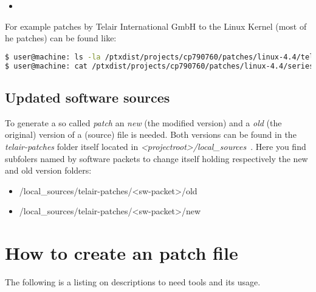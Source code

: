 \begin{itemize}
    \item
\end{itemize}

For example patches by Telair International GmbH to the Linux Kernel (most of he
patches) can be found like:

\begin{lstlisting}[keywordstyle=\color{black},language=bash,
caption={Example: Location of an telair patch}]
$ user@machine: ls -la /ptxdist/projects/cp790760/patches/linux-4.4/telair
$ user@machine: cat /ptxdist/projects/cp790760/patches/linux-4.4/series.MBa335x
\end{lstlisting}

\subsection{Updated software sources}
To generate a so called \textit{patch} an \textit{new} (the modified version)
and a \textit{old} (the original) version of a (source) file is needed. Both
versions can be found in the \textit{telair-patches} folder itself located in
\textit{<projectroot>/local\_sources}~\footnotemark[4].
Here you find subfolers named by software packets to change itself holding
respectively the new and old version folders:\@
\begin{itemize}
    \item <your projectroot>/local\_sources/telair-patches/<sw-packet>/old
    \item <your projectroot>/local\_sources/telair-patches/<sw-packet>/new
\end{itemize}


\section{How to create an patch file}%

The following is a listing on descriptions to need tools and its usage.

